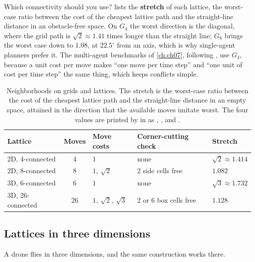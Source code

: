 Which connectivity should you use?  lists the \textbf{stretch} of each lattice, the worst-case ratio between the cost of the cheapest lattice path and the straight-line distance in an obstacle-free space. On $G_4$ the worst direction is the diagonal, where the grid path is $\sqrt2\approx1.41$ times longer than the straight line; $G_8$ brings the worst case down to $1.08$, at $22.5^\circ$ from an axis, which is why single-agent planners prefer it. The multi-agent benchmarks of \cref{ch:ch07}, following \textcite{stern2019mapf}, use $G_4$, because a unit cost per move makes ``one move per time step'' and ``one unit of cost per time step'' the same thing, which keeps conflicts simple.

\begin{table}[tb]
\centering\small
\caption{Neighborhoods on grids and lattices. The stretch is the worst-case ratio between the cost of the cheapest lattice path and the straight-line distance in an empty space, attained in the direction that the available moves imitate worst. The four values are printed by  in  as , ,  and .}
\label{tab:ch02-connectivity}
\begin{tabular}{@{}lclll@{}}
\toprule
Lattice & Moves & Move costs & Corner-cutting check & Stretch\\
\midrule
2D, 4-connected & 4 & $1$ & none & $\sqrt{2}\approx1.414$\\
2D, 8-connected & 8 & $1,\ \sqrt{2}$ & 2 side cells free & $1.082$\\
3D, 6-connected & 6 & $1$ & none & $\sqrt{3}\approx1.732$\\
3D, 26-connected & 26 & $1,\ \sqrt{2},\ \sqrt{3}$ & 2 or 6 box cells free & $1.128$\\
\bottomrule
\end{tabular}
\end{table}

\subsection{Lattices in three dimensions}
\label{sec:ch02-lattices}

A drone flies in three dimensions, and the same construction works there.

